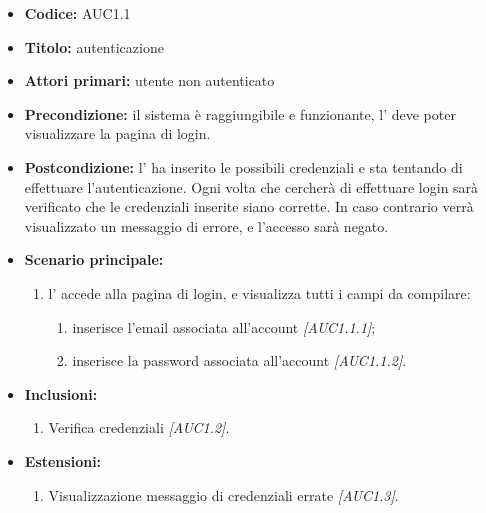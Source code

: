 \documentclass[casi-duso]{subfiles}
\begin{document}
\begin{itemize}
  \item \textbf{Codice:} AUC1.1
  \item \textbf{Titolo:} autenticazione
  \item \textbf{Attori primari:} utente non autenticato
  \item \textbf{Precondizione:} il sistema è raggiungibile e funzionante, l' deve poter visualizzare la pagina di login.
  \item \textbf{Postcondizione:} l' ha inserito le possibili credenziali e sta tentando di effettuare l'autenticazione. Ogni volta che cercherà di effettuare
        login sarà verificato che le credenziali inserite siano corrette. In caso contrario verrà visualizzato un messaggio di errore, e l'accesso sarà negato.
  \item \textbf{Scenario principale:}
  \begin{enumerate}
    \item  l' accede alla pagina di login, e visualizza tutti i campi da compilare:
    \begin{enumerate}
      \item inserisce l’email associata all’account \emph{[AUC1.1.1]};
      \item inserisce la password associata all’account \emph{[AUC1.1.2]}.
    \end{enumerate}
  \end{enumerate}
  \item \textbf{Inclusioni:}
  \begin{enumerate}
    \item Verifica credenziali \emph{[AUC1.2]}.
  \end{enumerate}
  \item \textbf{Estensioni:}
  \begin{enumerate}
    \item Visualizzazione messaggio di credenziali errate \emph{[AUC1.3]}.
  \end{enumerate}
\end{itemize}
\end{document}
